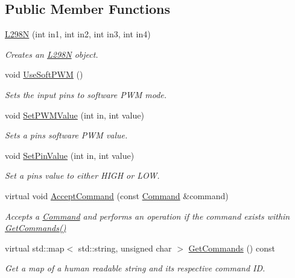 \subsection*{Public Member Functions}
\begin{DoxyCompactItemize}
\item 
\hyperlink{classrbp_1_1L298N_aa825d425be63819ee0ec35fac3fcdecf}{L298\+N} (int in1, int in2, int in3, int in4)
\begin{DoxyCompactList}\small\item\em Creates an \hyperlink{classrbp_1_1L298N}{L298\+N} object. \end{DoxyCompactList}\item 
void \hyperlink{classrbp_1_1L298N_ac618a203bef8bb8afbe194740be501a5}{Use\+Soft\+P\+W\+M} ()
\begin{DoxyCompactList}\small\item\em Sets the input pins to software P\+W\+M mode. \end{DoxyCompactList}\item 
void \hyperlink{classrbp_1_1L298N_a5fcc1b9a3c9f2812e8adefb49cb704ef}{Set\+P\+W\+M\+Value} (int in, int value)
\begin{DoxyCompactList}\small\item\em Sets a pin\textquotesingle{}s software P\+W\+M value. \end{DoxyCompactList}\item 
void \hyperlink{classrbp_1_1L298N_a65f4f98d23ddae3d659ce3f5084cbd1e}{Set\+Pin\+Value} (int in, int value)
\begin{DoxyCompactList}\small\item\em Set a pin\textquotesingle{}s value to either H\+I\+G\+H or L\+O\+W. \end{DoxyCompactList}\item 
virtual void \hyperlink{classrbp_1_1L298N_afa20e1274df6fb59a3d162e38b2408ea}{Accept\+Command} (const \hyperlink{classrbp_1_1Command}{Command} \&command)
\begin{DoxyCompactList}\small\item\em Accepts a \hyperlink{classrbp_1_1Command}{Command} and performs an operation if the command exists within \hyperlink{classrbp_1_1L298N_ad3bae353e3d17675672286a68ced9d24}{Get\+Commands()} \end{DoxyCompactList}\item 
virtual std\+::map$<$ std\+::string, unsigned char $>$ \hyperlink{classrbp_1_1L298N_ad3bae353e3d17675672286a68ced9d24}{Get\+Commands} () const 
\begin{DoxyCompactList}\small\item\em Get a map of a human readable string and its respective command I\+D. \end{DoxyCompactList}\item 

\end{DoxyCompactItemize}

